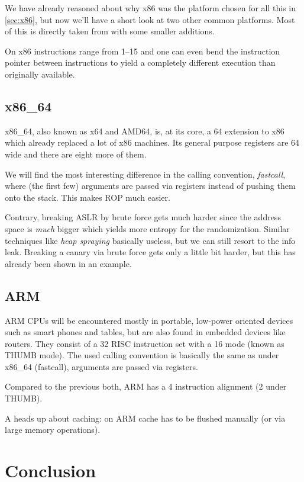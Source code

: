 \documentclass[article]{uibk}
\begin{document}
We have already reasoned about why x86 was the platform chosen for all this in
\cref{sec:x86}, but now we'll have a short look at two other common platforms.
Most of this is directly taken from \cite{rpisec} with some smaller additions.

On x86 instructions range from \SIrange{1}{15}{\byte} and one can even bend the
instruction pointer between instructions to yield a completely different
execution than originally available.

\subsection{x86\_64}

x86\_64, also known as x64 and AMD64, is, at its core, a \SI{64}{\bit}
extension to x86 which already replaced a lot of x86 machines. Its general
purpose registers are \SI{64}{\bit} wide and there are eight more of them.

We will find the most interesting difference in the calling convention,
\textit{fastcall}, where (the first few) arguments are passed via registers
instead of pushing them onto the stack. This makes ROP much easier.

Contrary, breaking ASLR by brute force gets much harder since the address space
is \emph{much} bigger which yields more entropy for the randomization. Similar
techniques like \textit{heap spraying} basically useless, but we can still
resort to the info leak. Breaking a canary via brute force gets only a little
bit harder, but this has already been shown in an example.

\subsection{ARM}

ARM CPUs will be encountered mostly in portable, low-power oriented devices
such as smart phones and tables, but are also found in embedded devices like
routers. They consist of a \SI{32}{\bit} RISC instruction set with a
\SI{16}{\bit} mode (known as THUMB mode). The used calling convention is
basically the same as under x86\_64 (fastcall), arguments are passed via
registers.

Compared to the previous both, ARM has a \SI{4}{\byte} instruction alignment
(\SI{2}{\byte} under THUMB).

A heads up about caching: on ARM cache has to be flushed manually (or via large
memory operations).

\section{Conclusion}
\end{document}
